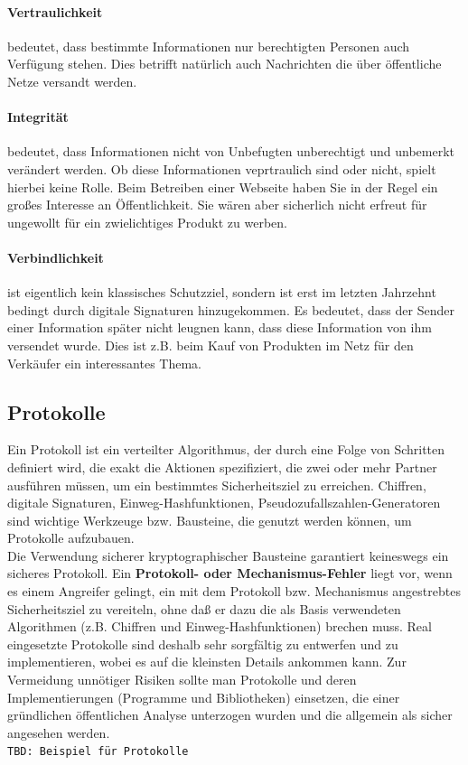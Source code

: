 \documentclass[a4paper,10pt,DIV9, BCOR12mm, oneside,openright,openbib]{scrreprt}
\theoremstyle{definition}
\theoremstyle{plain}
\begin{document}
\paragraph{Vertraulichkeit} bedeutet, dass bestimmte Informationen nur berechtigten Personen auch Verfügung stehen. Dies betrifft natürlich auch Nachrichten die über öffentliche Netze versandt werden.

\paragraph{Integrität} bedeutet, dass Informationen nicht von Unbefugten unberechtigt und unbemerkt verändert werden. Ob diese Informationen veprtraulich sind oder nicht, spielt hierbei keine Rolle. Beim Betreiben einer Webseite haben Sie in der Regel ein großes Interesse an Öffentlichkeit. Sie wären aber sicherlich nicht erfreut für ungewollt für ein zwielichtiges Produkt zu werben.

\paragraph{Verbindlichkeit} ist eigentlich kein klassisches Schutzziel, sondern ist erst im letzten Jahrzehnt bedingt durch digitale Signaturen hinzugekommen. Es bedeutet, dass der Sender einer Information später nicht leugnen kann, dass diese Information von ihm versendet wurde. Dies ist z.B. beim Kauf von Produkten im Netz für den Verkäufer ein interessantes Thema.
 
\subsection{Protokolle} 
Ein Protokoll ist ein verteilter Algorithmus, der durch eine Folge von Schritten definiert wird, die exakt die Aktionen spezifiziert, die zwei oder mehr Partner ausführen müssen, um ein bestimmtes Sicherheitsziel zu erreichen. Chiffren, digitale Signaturen, Einweg-Hashfunktionen, Pseudozufallszahlen-Generatoren sind wichtige Werkzeuge bzw. Bausteine, die genutzt werden können, um Protokolle aufzubauen. \\
Die Verwendung sicherer kryptographischer Bausteine garantiert keineswegs ein sicheres Protokoll. Ein \textbf{Protokoll- oder Mechanismus-Fehler} liegt vor, wenn es einem Angreifer gelingt, ein mit dem Protokoll bzw. Mechanismus angestrebtes Sicherheitsziel zu vereiteln, ohne daß er dazu die als Basis verwendeten Algorithmen (z.B. Chiffren und Einweg-Hashfunktionen) brechen muss. Real eingesetzte Protokolle sind deshalb sehr sorgfältig zu entwerfen und zu implementieren, wobei es auf die kleinsten Details ankommen kann. 
Zur Vermeidung unnötiger Risiken sollte man Protokolle und deren Implementierungen (Programme und Bibliotheken) einsetzen, die einer gründlichen öffentlichen Analyse unterzogen wurden und die allgemein als sicher angesehen werden. \\
\texttt{TBD: Beispiel für Protokolle}
\end{document}
